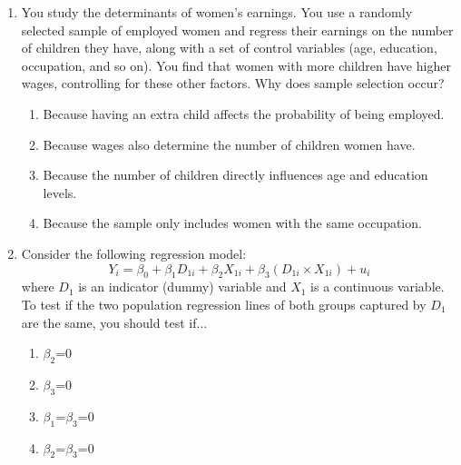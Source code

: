 \documentclass{article}
\begin{document}
\begin{enumerate}
    \item You study the determinants of women’s earnings. You use a randomly selected sample of employed women and regress their earnings on the number of children they have, along with a set of control variables (age, education, occupation, and so on). You find that women with more children have higher wages, controlling for these other factors. Why does sample selection occur?
    \begin{enumerate}[label=\alph*)]
        \item Because having an extra child affects the probability of being employed.
        \item Because wages also determine the number of children women have.
        \item Because the number of children directly influences age and education levels.
        \item Because the sample only includes women with the same occupation.
    \end{enumerate}\vspace{.25cm}

    \item Consider the following regression model:
\begin{equation*}
    Y_i = \beta_0 + \beta_1 D_{1i} + \beta_2 X_{1i} + \beta_3 (D_{1i} \times X_{1i}) + u_i
\end{equation*}
where $D_1$ is an indicator (dummy) variable and $X_1$ is a continuous variable. To test if the two population regression lines of both groups captured by $D_1$ are the same, you should test if...
    \begin{enumerate}[label=\alph*)]
        \item $\beta_2$=0
        \item $\beta_3$=0
        \item $\beta_1$=$\beta_3$=0
        \item $\beta_2$=$\beta_3$=0
    \end{enumerate}\vspace{.25cm}




\end{enumerate}


\newpage
{}\\[2em]
\end{document}
